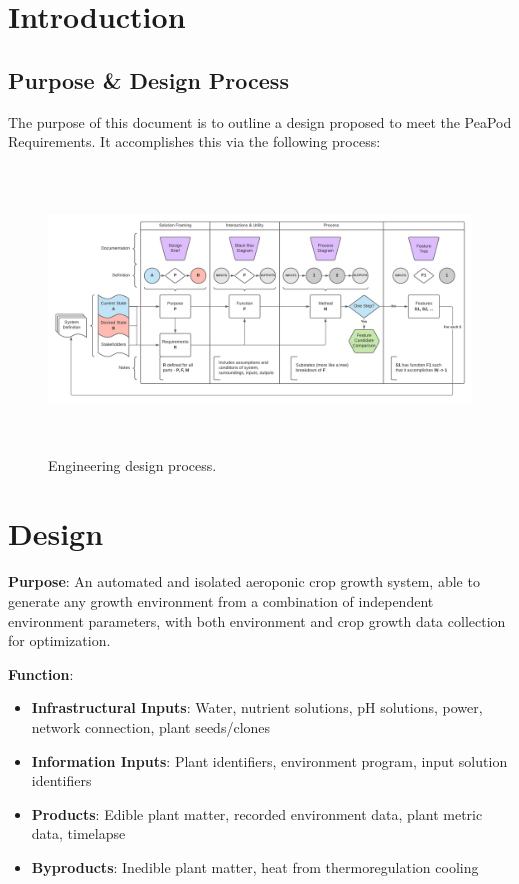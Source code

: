 \documentclass{report}
\begin{document}
\tableofcontents
\newpage

\section{Introduction}
\label{sec:intro}

\subsection{Purpose \& Design Process}
\label{sec:purpose}

The purpose of this document is to outline a design proposed to meet the PeaPod Requirements. It accomplishes this via the following process:

\begin{figure}[h]
    \centering
    \includegraphics[height=7.55cm,angle=90,origin=c]{images/designprocess.png}
    \hfill
    \caption{Engineering design process.}
\end{figure}

\newpage

\section{Design}

\textbf{Purpose}: An automated and isolated aeroponic crop growth system, able to generate any growth environment from a combination of independent environment parameters, with both environment and crop growth data collection for optimization.

\textbf{Function}:
\begin{itemize}
    \item \textbf{Infrastructural Inputs}: Water, nutrient solutions, pH solutions, power, network connection, plant seeds/clones
    \item \textbf{Information Inputs}: Plant identifiers, environment program, input solution identifiers
    \item \textbf{Products}: Edible plant matter, recorded environment data, plant metric data, timelapse
    \item \textbf{Byproducts}: Inedible plant matter, heat from thermoregulation cooling
\end{itemize}
\end{document}

